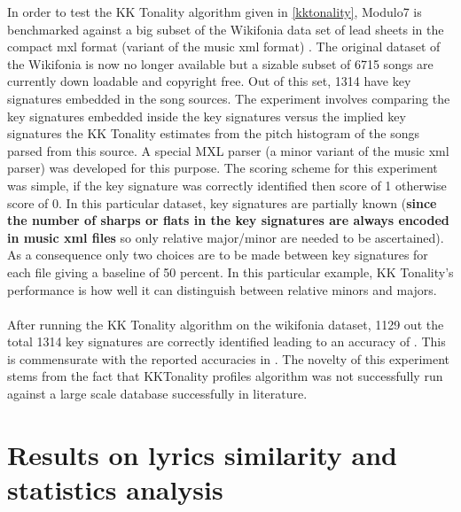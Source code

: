 \noindent In order to test the KK Tonality algorithm given in \ref{kktonality}, Modulo7 is benchmarked against a big subset of the Wikifonia data set of lead sheets in the compact mxl format (variant of the music xml format) \cite{WikifoniaDataset}. The original dataset of the Wikifonia is now no longer available but a sizable subset of 6715 songs are currently down loadable and copyright free. Out of this set, 1314 have key signatures embedded in the song sources. The experiment involves comparing the key signatures embedded inside the key signatures versus the implied key signatures the KK Tonality estimates from the pitch histogram of the songs parsed from this source. A special MXL parser (a minor variant of the music xml parser) was developed for this purpose. The scoring scheme for this experiment was simple, if the key signature was correctly identified then score of 1 otherwise score of 0. In this particular dataset, key signatures are partially known (\textbf{since the number of sharps or flats in the key signatures are always encoded in music xml files} so only relative major/minor are needed to be ascertained). As a consequence only two choices are to be made between key signatures for each file giving a baseline of 50 percent. In this particular example, KK Tonality's performance is how well it can distinguish between relative minors and majors. \\\\
After running the KK Tonality algorithm on the wikifonia dataset, 1129 out the total 1314 key signatures are correctly identified leading to an accuracy of . This is commensurate with the reported accuracies in \cite{kkTonalityKeyFinding}. The novelty of this experiment stems from the fact that KKTonality profiles algorithm was not successfully run against a large scale database successfully in literature. 

\section{Results on lyrics similarity and statistics analysis}


